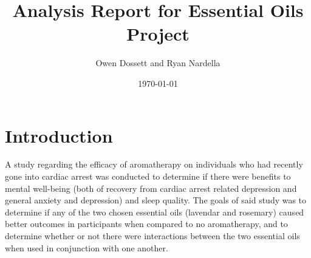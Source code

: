\documentclass{article}
\title{Analysis Report for Essential Oils Project}
\author{Owen Dossett and Ryan Nardella}
\date{\today}
\begin{document}
\maketitle
\tableofcontents
\newpage


\section{Introduction}
A study regarding the efficacy of aromatherapy on individuals who had recently
gone into cardiac arrest was conducted to determine if there were benefits
to mental well-being (both of recovery from cardiac arrest related depression and general anxiety
and depression) and sleep quality.  The goals of said study was to determine if
any of the two chosen essential oils (lavendar and rosemary) caused better outcomes in participants when
compared to no aromatherapy, and to determine whether or not there were interactions
between the two essential oils when used in conjunction with one another.
\end{document}
